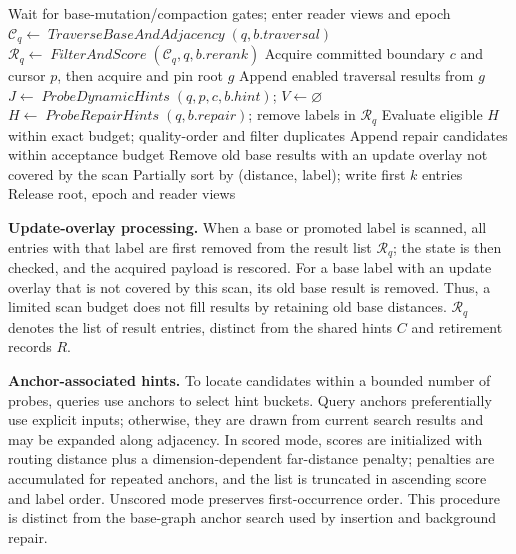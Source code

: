 \documentclass[sigconf,pbalance]{acmart}
\newcommand{\AFn}[1]{\operatorname{\mathit{#1}}}
\begin{document}
\begin{algorithm}[t]
\caption{SearchMergeFilter}
\label{alg:search-merge-filter}
Wait for base-mutation/compaction gates; enter reader views and epoch\;
$\mathcal{C}_q\gets\AFn{TraverseBaseAndAdjacency}(q,b.traversal)$\;
$\mathcal{R}_q\gets\AFn{FilterAndScore}(\mathcal{C}_q,q,b.rerank)$\;
Acquire committed boundary $c$ and cursor $p$, then acquire and pin root $g$\;
Append enabled traversal results from $g$\;
$J\gets\AFn{ProbeDynamicHints}(q,p,c,b.hint)$; $V\gets\varnothing$\;
$H\gets\AFn{ProbeRepairHints}(q,b.repair)$; remove labels in $\mathcal{R}_q$\;
Evaluate eligible $H$ within exact budget; quality-order and filter duplicates\;
Append repair candidates within acceptance budget\;
Remove old base results with an update overlay not covered by the scan\;
\ForEach{slot $j\in[p,c)$ within the position-counted fallback budget}{
    \If{$j\notin V$}{Check state, score available payload, append\;}
}
Partially sort by (distance, label); write first $k$ entries\;
Release root, epoch and reader views\;
\end{algorithm}

\textbf{Update-overlay processing.} When a base or promoted label is scanned, all entries with that label are first removed from the result list $\mathcal{R}_q$; the state is then checked, and the acquired payload is rescored. For a base label with an update overlay that is not covered by this scan, its old base result is removed. Thus, a limited scan budget does not fill results by retaining old base distances. $\mathcal{R}_q$ denotes the list of result entries, distinct from the shared hints $C$ and retirement records $R$.

\textbf{Anchor-associated hints.} To locate candidates within a bounded number of probes, queries use anchors to select hint buckets. Query anchors preferentially use explicit inputs; otherwise, they are drawn from current search results and may be expanded along adjacency. In scored mode, scores are initialized with routing distance plus a dimension-dependent far-distance penalty; penalties are accumulated for repeated anchors, and the list is truncated in ascending score and label order. Unscored mode preserves first-occurrence order. This procedure is distinct from the base-graph anchor search used by insertion and background repair.
\end{document}
